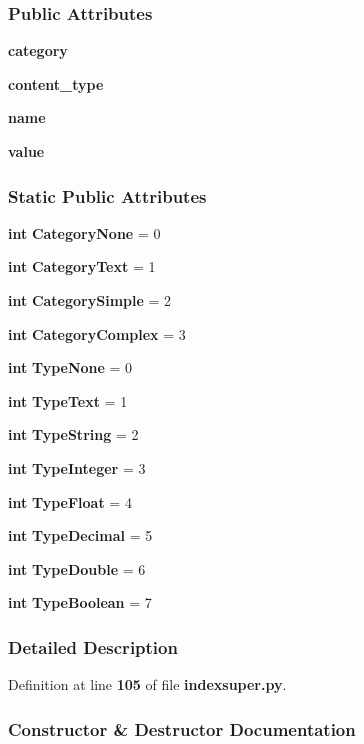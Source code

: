\subsubsection*{Public Attributes}
\begin{DoxyCompactItemize}
\item 
{\bf category}
\item 
{\bf content\+\_\+type}
\item 
{\bf name}
\item 
{\bf value}
\end{DoxyCompactItemize}
\subsubsection*{Static Public Attributes}
\begin{DoxyCompactItemize}
\item 
{\bf int} {\bf Category\+None} = 0
\item 
{\bf int} {\bf Category\+Text} = 1
\item 
{\bf int} {\bf Category\+Simple} = 2
\item 
{\bf int} {\bf Category\+Complex} = 3
\item 
{\bf int} {\bf Type\+None} = 0
\item 
{\bf int} {\bf Type\+Text} = 1
\item 
{\bf int} {\bf Type\+String} = 2
\item 
{\bf int} {\bf Type\+Integer} = 3
\item 
{\bf int} {\bf Type\+Float} = 4
\item 
{\bf int} {\bf Type\+Decimal} = 5
\item 
{\bf int} {\bf Type\+Double} = 6
\item 
{\bf int} {\bf Type\+Boolean} = 7
\end{DoxyCompactItemize}


\subsubsection{Detailed Description}


Definition at line {\bf 105} of file {\bf indexsuper.\+py}.



\subsubsection{Constructor \& Destructor Documentation}
